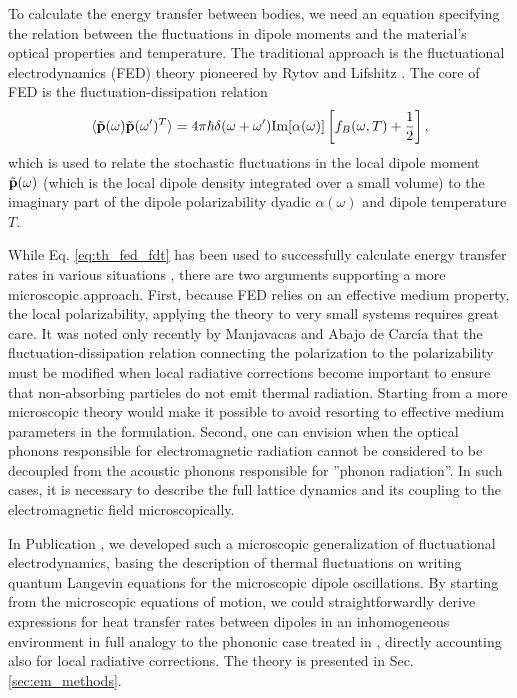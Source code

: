 To calculate the energy transfer between bodies, we need an equation specifying the relation between the fluctuations in dipole moments and the material's optical properties and temperature. The traditional approach is the fluctuational electrodynamics (FED) theory pioneered by Rytov \cite{rytov} and Lifshitz \cite{lifshitz55}. The core of FED is the fluctuation-dissipation relation \cite{novotny,agarwal75_1}
\begin{equation}
 \langle \tilde{\mathbf{p}}(\omega)\tilde{\mathbf{p}}(\omega')^T\rangle = 4\pi \hbar \delta(\omega+\omega')  \textrm{Im}[\alpha(\omega)] \left[f_B(\omega,T)+\frac{1}{2} \right], \label{eq:th_fed_fdt}
\end{equation}
which is used to relate the stochastic fluctuations in the local dipole moment $\tilde{\mathbf{p}}(\omega)$ (which is the local dipole density integrated over a small volume) to the imaginary part of the dipole polarizability dyadic $\alpha(\omega)$ and dipole temperature $T$. 

While Eq. \eqref{eq:th_fed_fdt} has been used to successfully calculate energy transfer rates in various situations \cite{}, there are two arguments supporting a more microscopic approach. First, because FED relies on an effective medium property, the local polarizability, applying the theory to very small systems requires great care. It was noted only recently by Manjavacas and Abajo de Carc\'ia \cite{manjavacas12} that the fluctuation-dissipation relation connecting the polarization to the polarizability must be modified when local radiative corrections become important to ensure that non-absorbing particles do not emit thermal radiation. Starting from a more microscopic theory would make it possible to avoid resorting to effective medium parameters in the formulation. Second, one can envision  when the optical phonons responsible for electromagnetic radiation cannot be considered to be decoupled from the acoustic phonons responsible for ''phonon radiation''. In such cases, it is necessary to describe the full lattice dynamics and its coupling to the electromagnetic field microscopically. 

In Publication , we developed such a microscopic generalization of fluctuational electrodynamics, basing the description of thermal fluctuations on writing quantum Langevin equations for the microscopic dipole oscillations. By starting from the microscopic equations of motion, we could straightforwardly derive expressions for heat transfer rates between dipoles in an inhomogeneous environment in full analogy to the phononic case treated in , directly accounting also for local radiative corrections. The theory is presented in Sec. \ref{sec:em_methods}.


